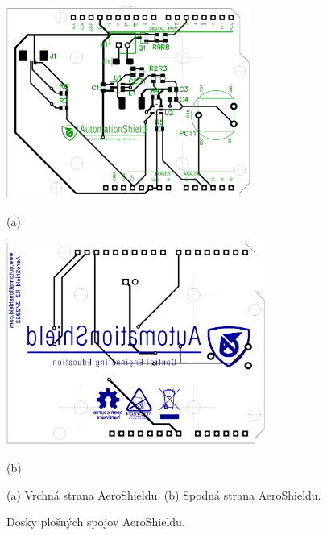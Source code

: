 \begin{figure}[!tbh]
	\centering
	\includegraphics[width=8cm]{obr/AeroShield3TOP.png}
	
	(a)
	
	\includegraphics[width=8.5cm]{obr/AeroShield3BOTTOM.png}
	
	(b)
	
	\caption{(a) Vrchná strana AeroShieldu. (b) Spodná strana AeroShieldu.}
	\label{OBRAZOK 2.4}
\end{figure}



\begin{figure}
	\hfill
	\hfill
	\hfill
	\caption{Dosky plošných spojov AeroShieldu.}\label{OBRAZOK 2.7}
\end{figure}

